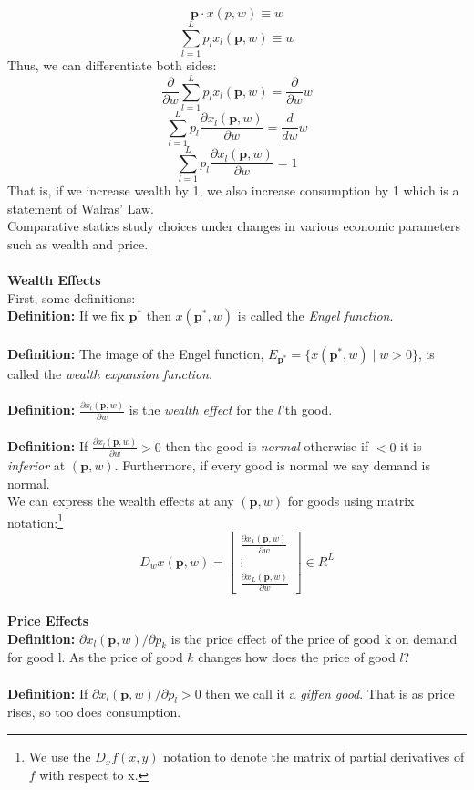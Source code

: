 \documentclass[12pt]{article}
\let\bf\oldbf
\let\bf\textbf
\begin{document}
$$\bf{p}\cdot x(p,w) \equiv w$$
$$\sum^L_{l=1}p_lx_l(\bf{p}, w) \equiv w$$
Thus, we can differentiate both sides:
$$\frac{\partial}{\partial w}\sum^L_{l=1}p_lx_l(\bf{p}, w) = \frac{\partial}{\partial w}w$$
$$\sum^L_{l=1}p_l\frac{\partial x_l(\bf{p}, w)}{\partial w} = \frac{d}{dw}w$$
$$\sum^L_{l=1}p_l\frac{\partial x_l(\bf{p}, w)}{\partial w} = 1$$
That is, if we increase wealth by 1, we also increase consumption by 1 which is a statement of Walras' Law.
\vspace{10pt}
\\Comparative statics study choices under changes in various economic parameters such as wealth and price.
\\\bf{\\Wealth Effects}
\\ First, some definitions:
\\ \bf{Definition:} If we fix $\bf{p}^*$ then $x(\bf{p}^*, w)$ is called the \emph{Engel function}.
\\ \bf{\\Definition:} The image of the Engel function, $E_{\bf{p}^*} = \{x(\bf{p}^*,w) \; | \; w > 0\}$, is called the \emph{wealth expansion function}.
\\ \bf{\\Definition:} $\frac{\partial x_l(\bf{p},w)}{\partial w}$ is the \emph{wealth effect} for the $l$'th good.
\\ \bf{\\Definition:} If $\frac{\partial x_l(\bf{p},w)}{\partial w} > 0$ then the good is \emph{normal} otherwise if $< 0$ it is \emph{inferior} at $(\bf{p}, w)$. Furthermore, if every good is normal we say demand is normal.
\\ We can express the wealth effects at any $(\bf{p}, w)$ for goods using matrix notation:\footnote{We use the $D_xf(x,y)$ notation to denote the matrix of partial derivatives of $f$ with respect to x.}
$$D_wx(\bf{p}, w) = \begin{bmatrix} 
\frac{\partial x_1(\bf{p},w)}{\partial w} \\
\vdots \\
\frac{\partial x_L(\bf{p},w)}{\partial w} 
\end{bmatrix} \in R^L$$
\\ \bf{Price Effects}
\\ \bf{Definition:} $\partial x_l(\bf{p}, w)/\partial p_k$ is the price effect of the price of good k on demand for good l. As the price of good $k$ changes how does the price of good $l$?
\\ \bf{\\Definition:} If $\partial x_l(\bf{p}, w)/\partial p_l > 0$ then we call it a \emph{giffen good}. That is as price rises, so too does consumption.
\end{document}
